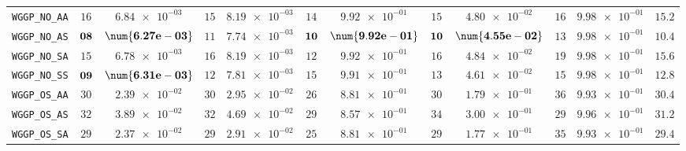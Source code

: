 \begin{xltabular}{\textwidth}{l||cC|cC|cC|cC|cC||c}
	\texttt{WGGP\_NO\_AA} & $ 16$ & $ \num{6.84e-03}$ & $ 15$ & $ \num{8.19e-03}$ & $ 14$ & $ \num{9.92e-01}$ & $ 15$ & $ \num{4.80e-02}$ & $ 16$ & $ \num{9.98e-01}$ & $ 15.2$  \\
	\texttt{WGGP\_NO\_AS} & $\bf 08$ & $\bf \num{6.27e-03}$ & $ 11$ & $ \num{7.74e-03}$ & $\bf 10$ & $\bf \num{9.92e-01}$ & $\bf 10$ & $\bf \num{4.55e-02}$ & $ 13$ & $ \num{9.98e-01}$ & $ 10.4$  \\
	\texttt{WGGP\_NO\_SA} & $ 15$ & $ \num{6.78e-03}$ & $ 16$ & $ \num{8.19e-03}$ & $ 12$ & $ \num{9.92e-01}$ & $ 16$ & $ \num{4.84e-02}$ & $ 19$ & $ \num{9.98e-01}$ & $ 15.6$  \\
	\texttt{WGGP\_NO\_SS} & $\bf 09$ & $\bf \num{6.31e-03}$ & $ 12$ & $ \num{7.81e-03}$ & $ 15$ & $ \num{9.91e-01}$ & $ 13$ & $ \num{4.61e-02}$ & $ 15$ & $ \num{9.98e-01}$ & $ 12.8$  \\
	\texttt{WGGP\_OS\_AA} & $ 30$ & $ \num{2.39e-02}$ & $ 30$ & $ \num{2.95e-02}$ & $ 26$ & $ \num{8.81e-01}$ & $ 30$ & $ \num{1.79e-01}$ & $ 36$ & $ \num{9.93e-01}$ & $ 30.4$  \\
	\texttt{WGGP\_OS\_AS} & $ 32$ & $ \num{3.89e-02}$ & $ 32$ & $ \num{4.69e-02}$ & $ 29$ & $ \num{8.57e-01}$ & $ 34$ & $ \num{3.00e-01}$ & $ 29$ & $ \num{9.96e-01}$ & $ 31.2$  \\
	\texttt{WGGP\_OS\_SA} & $ 29$ & $ \num{2.37e-02}$ & $ 29$ & $ \num{2.91e-02}$ & $ 25$ & $ \num{8.81e-01}$ & $ 29$ & $ \num{1.77e-01}$ & $ 35$ & $ \num{9.93e-01}$ & $ 29.4$  \\

\end{xltabular}

